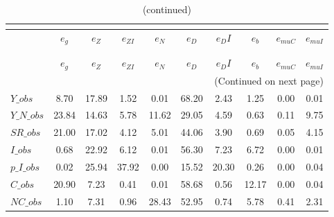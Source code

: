 
\begin{center}
\begin{longtable}{lccccccccc} 
\caption{VARIANCE DECOMPOSITION (in percent)}\\
 \label{Table:th_var_decomp_uncond}\\
\toprule 
$               $	 & 	 $        {e_g}$	 & 	 $        {e_Z}$	 & 	 $     {e_{ZI}}$	 & 	 $        {e_N}$	 & 	 $        {e_D}$	 & 	 $       {e_DI}$	 & 	 $        {e_b}$	 & 	 $    {e_{muC}}$	 & 	 $    {e_{muI}}$\\
\midrule \endfirsthead 
\caption{(continued)}\\
 \toprule \\ 
$               $	 & 	 $        {e_g}$	 & 	 $        {e_Z}$	 & 	 $     {e_{ZI}}$	 & 	 $        {e_N}$	 & 	 $        {e_D}$	 & 	 $       {e_DI}$	 & 	 $        {e_b}$	 & 	 $    {e_{muC}}$	 & 	 $    {e_{muI}}$\\
\midrule \endhead 
\midrule \multicolumn{10}{r}{(Continued on next page)} \\ \bottomrule \endfoot 
\bottomrule \endlastfoot 
$Y\_obs         $	 & 	         8.70	 & 	        17.89	 & 	         1.52	 & 	         0.01	 & 	        68.20	 & 	         2.43	 & 	         1.25	 & 	         0.00	 & 	         0.01 \\ 
$Y\_N\_obs      $	 & 	        23.84	 & 	        14.63	 & 	         5.78	 & 	        11.62	 & 	        29.05	 & 	         4.59	 & 	         0.63	 & 	         0.11	 & 	         9.75 \\ 
$SR\_obs        $	 & 	        21.00	 & 	        17.02	 & 	         4.12	 & 	         5.01	 & 	        44.06	 & 	         3.90	 & 	         0.69	 & 	         0.05	 & 	         4.15 \\ 
$I\_obs         $	 & 	         0.68	 & 	        22.92	 & 	         6.12	 & 	         0.01	 & 	        56.30	 & 	         7.23	 & 	         6.72	 & 	         0.00	 & 	         0.01 \\ 
$p\_I\_obs      $	 & 	         0.02	 & 	        25.94	 & 	        37.92	 & 	         0.00	 & 	        15.52	 & 	        20.30	 & 	         0.26	 & 	         0.00	 & 	         0.04 \\ 
$C\_obs         $	 & 	        20.90	 & 	         7.23	 & 	         0.41	 & 	         0.01	 & 	        58.68	 & 	         0.56	 & 	        12.17	 & 	         0.00	 & 	         0.04 \\ 
$NC\_obs        $	 & 	         1.10	 & 	         7.31	 & 	         0.96	 & 	        28.43	 & 	        52.95	 & 	         0.74	 & 	         5.78	 & 	         0.41	 & 	         2.31 \\ 

\end{longtable}
\end{center}
